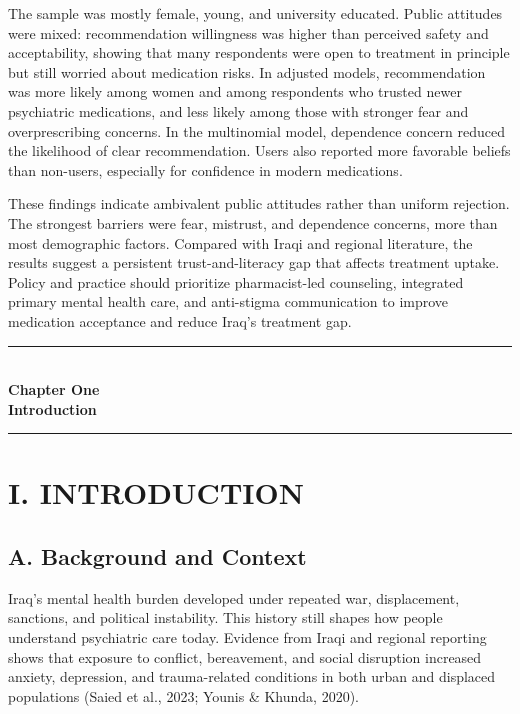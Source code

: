 \documentclass[12pt,a4paper]{article}
\begin{document}
The sample was mostly female, young, and university educated. Public attitudes were mixed: recommendation willingness was higher than perceived safety and acceptability, showing that many respondents were open to treatment in principle but still worried about medication risks. In adjusted models, recommendation was more likely among women and among respondents who trusted newer psychiatric medications, and less likely among those with stronger fear and overprescribing concerns. In the multinomial model, dependence concern reduced the likelihood of clear recommendation. Users also reported more favorable beliefs than non-users, especially for confidence in modern medications.

These findings indicate ambivalent public attitudes rather than uniform rejection. The strongest barriers were fear, mistrust, and dependence concerns, more than most demographic factors. Compared with Iraqi and regional literature, the results suggest a persistent trust-and-literacy gap that affects treatment uptake. Policy and practice should prioritize pharmacist-led counseling, integrated primary mental health care, and anti-stigma communication to improve medication acceptance and reduce Iraq’s treatment gap.

\newpage
\thispagestyle{plain}
\begin{center}\vspace*{0.30\textheight}
{\Large\bfseries\rule{4cm}{0.4pt}}\\[10pt]
{\Huge\bfseries Chapter One}\\[8pt]
{\Large\bfseries Introduction}\\[10pt]
{\Large\bfseries\rule{4cm}{0.4pt}}
\end{center}
\newpage
\section*{I. INTRODUCTION}
\subsection*{A. Background and Context}
Iraq’s mental health burden developed under repeated war, displacement, sanctions, and political instability. This history still shapes how people understand psychiatric care today. Evidence from Iraqi and regional reporting shows that exposure to conflict, bereavement, and social disruption increased anxiety, depression, and trauma-related conditions in both urban and displaced populations (Saied et al., 2023; Younis \& Khunda, 2020).
\end{document}
